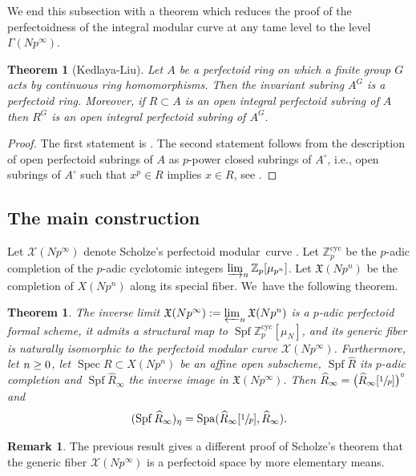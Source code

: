 \documentclass[11pt]{article}
\newcommand{\ie}{i.e.,\xspace}
\newcommand{\cyc}{\mathrm{cyc}}
\numberwithin{equation}{section}
\newtheorem{theo}[prop]{Theorem}
\theoremstyle{definition}
\newtheorem{remark}[prop]{Remark}
\newcommand{\bb}[1]{\mathbb{#1}}
\newcommand{\n}[1]{\mathcal{#1}}
\newcommand{\f}[1]{\mathfrak{#1}}
\DeclareMathOperator{\Spf}{Spf}
\DeclareMathOperator{\Spec}{Spec}
\DeclareMathOperator{\Spa}{Spa}
\newcommand{\mc}[1]{X(Np^{#1})}
\begin{document}
We end this subsection with a theorem which reduces the proof of the perfectoidness of the integral modular curve at any tame level to the level $\Gamma(Np^\infty)$.

\begin{theo}[Kedlaya-Liu]
\label{theoinvperf}
Let $A$ be a perfectoid ring on which a finite group $G$ acts by continuous ring homomorphisms. Then the invariant subring $A^G$ is a perfectoid ring. Moreover, if $R\subset A$ is an open integral perfectoid subring of $A$ then $R^G$ is an open integral perfectoid subring of $A^G$.
\end{theo}

\begin{proof}
The first statement is \cite[Th.\,3.3.26]{kedlaya2016relative}. The second statement follows from the description of open perfectoid subrings of $A$ as $p$-power closed subrings of $A^\circ$, \ie open subrings of $A^\circ$ such that $x^p \in R$ implies $x\in R$, see \cite[Cor.\,2.2]{MorrowFoundPerfectoid}.
\end{proof}

\subsection*{The main construction}

Let $\n{X}(Np^\infty)$ denote Scholze's perfectoid modular~curve \cite{scholzeTorsCoho2015}. Let $\bb{Z}_p^{\cyc}$ be the $p$-adic completion of the $p$-adic cyclotomic integers $\varinjlim_n \bb{Z}_p[\mu_{p^n}]$. Let $\f{X}(Np^n)$ be the completion of $\mc{n}$ along its special fiber. We~have the following theorem.

\begin{theo}
\label{theoexistperfint}
The inverse limit $\f{X}(Np^\infty):=\varprojlim_{n} \f{X}(Np^n)$ is a $p$-adic perfectoid formal scheme, it admits a structural map to $\Spf \bb{Z}_p^{\cyc}[\mu_{N}]$, and its generic fiber is naturally isomorphic to the perfectoid modular curve $\n{X}(Np^\infty)$. Furthermore, let $n\geq\nobreak 0$, let $\Spec R \subset X(Np^n)$ be an affine open subscheme, $\Spf \widehat{R}$ its $p$-adic completion and $\Spf \widehat{R}_{\infty}$ the inverse image in $\f{X}(Np^\infty)$. Then $\widehat{R}_{\infty}= \bigl(\widehat{R}_{\infty}[\sfrac{1}{p}]\bigr)^{\circ}$ and
\[
(\Spf \widehat{R}_{\infty})_{\eta}= \Spa(\widehat{R}_{\infty}[\sfrac{1}{p}], \widehat{R}_{\infty}).
\]
\end{theo}

\begin{remark}
The previous result gives a different proof of Scholze's theorem that the generic fiber $\n{X}(Np^\infty)$ is a perfectoid space by more elementary means.
\end{remark}
\end{document}
